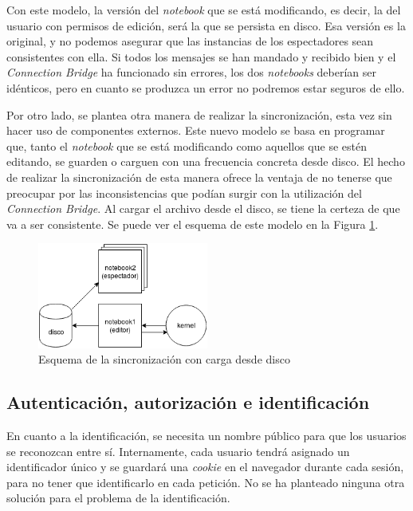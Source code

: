 \documentclass[11pt,spanish,listoffigures]{tfgetsinf}
\begin{document}
Con este modelo, la versión del \textit{notebook} que se está modificando, es decir, la del usuario con permisos de edición, será la que se persista en disco. Esa versión es la original, y no podemos asegurar que las instancias de los espectadores sean consistentes con ella. Si todos los mensajes se han mandado y recibido bien y el \textit{Connection Bridge} ha funcionado sin errores, los dos \textit{notebooks} deberían ser idénticos, pero en cuanto se produzca un error no podremos estar seguros de ello.

Por otro lado, se plantea otra manera de realizar la sincronización, esta vez sin hacer uso de componentes externos. Este nuevo modelo se basa en programar que, tanto el \textit{notebook} que se está modificando como aquellos que se estén editando, se guarden o carguen con una frecuencia concreta desde disco. El hecho de realizar la sincronización de esta manera ofrece la ventaja de no tenerse que preocupar por las inconsistencias que podían surgir con la utilización del \textit{Connection Bridge}. Al cargar el archivo desde el disco, se tiene la certeza de que va a ser consistente. Se puede ver el esquema de este modelo en la Figura \ref{fig:disk-scheme}.

\begin{figure}[h]
	\centering
  	\includegraphics[width=0.5\textwidth]{JSON-sync.png}
  	\caption{Esquema de la sincronización con carga desde disco}
  	\label{fig:disk-scheme}
\end{figure}


\subsection{Autenticación, autorización e identificación}
\label{subsec:identificacin-permisos}

En cuanto a la identificación, se necesita un nombre público para que los usuarios se reconozcan entre sí. Internamente, cada usuario tendrá asignado un identificador único y se guardará una \textit{\gls{cookie}} en el navegador durante cada sesión, para no tener que identificarlo en cada petición. No se ha planteado ninguna otra solución para el problema de la identificación.
\end{document}
